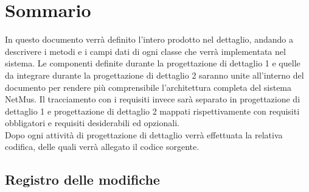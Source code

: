 \newcommand{\nomedoc}{Definizione Del Prodotto}
\newcommand{\versione}{1.0}
\newcommand{\versioneglossario}{3.0}
\newcommand{\versionenormeprogetto}{3.0}
\newcommand{\versionespecifica}{2.0}
\newcommand{\nomefile}{DefinizioneDelProdotto-\versione.pdf}
\newcommand{\datacreazione}{3 Febbraio 2011}
\newcommand{\datamodifica}{25 Febbraio 2011}
\newcommand{\stato}{formale}
\newcommand{\uso}{esterno}
\newcommand{\redazione}{---}
\newcommand{\verifica}{---}
\newcommand{\approvazione}{---}
\newcommand{\distribuzione}{
VT.G \\
& Prof. Vardanega Tullio\\
& Prof. Cardin Riccardo }


\usepackage{amsfonts}





\chapter*{Sommario}
\thispagestyle{fancy}
In questo documento verr\`a definito l'intero prodotto nel dettaglio, andando a
descrivere i metodi e i campi dati di ogni classe che verr\`a implementata nel
sistema. Le componenti definite durante la progettazione di dettaglio 1 e quelle
da integrare durante la progettazione di dettaglio 2 saranno unite all'interno
del documento per rendere pi\`u comprensibile l'architettura completa del sistema
NetMus. Il tracciamento con i requisiti invece sar\`a separato in progettazione
di dettaglio 1 e progettazione di dettaglio 2 mappati rispettivamente con
requisiti obbligatori e requisiti desiderabili ed opzionali.\\
Dopo ogni attivit\`a di progettazione di dettaglio verr\`a effettuata la
relativa codifica, delle quali verr\`a allegato il codice sorgente.

\newpage
\section*{Registro delle modifiche}

